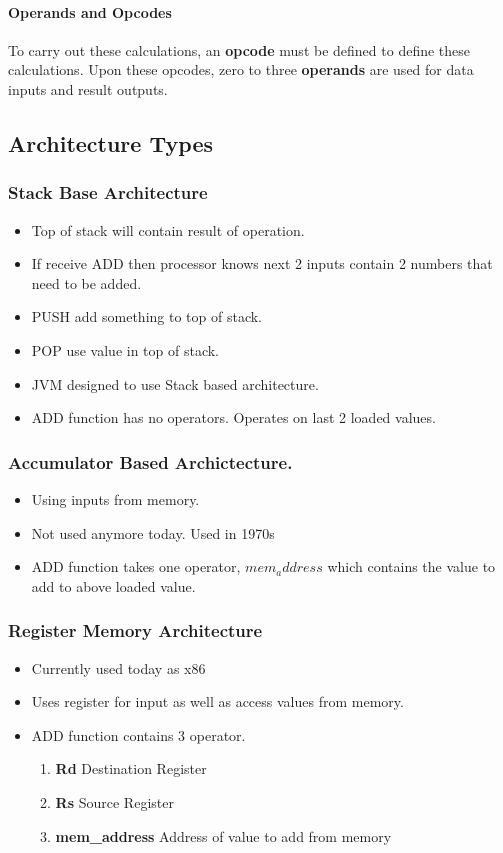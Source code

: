 \documentclass{article}
\newcommand\tab[1][0.5cm]{\hspace*{#1}}
\begin{document}
		\paragraph{\tab Operands and Opcodes} To carry out these calculations, an \textbf{opcode} must be defined to define these calculations. Upon these opcodes, zero to three \textbf{operands} are used for data inputs and result outputs.

	\subsection{Architecture Types}
		\subsubsection{Stack Base Architecture}
			\begin{itemize}
				\item Top of stack will contain result of operation.
				\item If receive ADD then processor knows next 2 inputs contain 2 numbers that need to be added.
				\item PUSH add something to top of stack.
				\item POP use value in top of stack.
				\item JVM designed to use Stack based architecture.
				\item ADD function has no operators. Operates on last 2 loaded values.
			\end{itemize}

		\subsubsection{Accumulator Based Archictecture.}
			\begin{itemize}
				\item Using inputs from memory.
				\item Not used anymore today. Used in 1970s
				\item ADD function takes one operator, $mem_address$ which contains the value to add to above loaded value.
			\end{itemize}

		\subsubsection{Register Memory Architecture}
			\begin{itemize}
				\item Currently used today as x86
				\item Uses register for input as well as access values from memory.
				\item ADD function contains 3 operator.
					\begin{enumerate}
						\item \textbf{Rd} Destination Register
						\item \textbf{Rs} Source Register
						\item \textbf{mem\_address} Address of value to add from memory
					\end{enumerate}
			\end{itemize}
\end{document}
